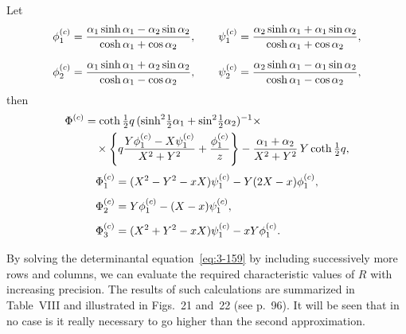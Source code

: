 Let
\begin{align}
\phi_1^{(c)} &= \frac{\alpha_1\sinh\alpha_1 - \alpha_2\sin\alpha_2}{\cosh\alpha_1 + \cos\alpha_2}, \qquad
\psi_1^{(c)} = \frac{\alpha_2\sinh\alpha_1 + \alpha_1\sin\alpha_2}{\cosh\alpha_1 + \cos\alpha_2}, \notag\\[6pt]
\phi_2^{(c)} &= \frac{\alpha_1\sinh\alpha_1 + \alpha_2\sin\alpha_2}{\cosh\alpha_1 - \cos\alpha_2}, \qquad
\psi_2^{(c)} = \frac{\alpha_2\sinh\alpha_1 - \alpha_1\sin\alpha_2}{\cosh\alpha_1 - \cos\alpha_2}, \label{eq:3-166}
\end{align}
then
\begin{align}
\Phi^{(c)} &= \coth\tfrac{1}{2}q\,(\sinh^2\!\tfrac{1}{2}\alpha_1 + \sin^2\!\tfrac{1}{2}\alpha_2)^{-1}\times \notag\\
&\quad\times\left\{q\frac{Y\phi_1^{(c)} - X\psi_1^{(c)}}{X^2+Y^2} + \frac{\phi_1^{(c)}}{z}\right\} - \frac{\alpha_1+\alpha_2}{X^2+Y^2}\,Y\coth\tfrac{1}{2}q, \label{eq:3-167}
\end{align}
\begin{align}
\Phi_1^{(c)} &= (X^2 - Y^2 - xX)\psi_1^{(c)} - Y(2X-x)\phi_1^{(c)}, \notag\\[4pt]
\Phi_2^{(c)} &= Y\phi_1^{(c)} - (X-x)\psi_1^{(c)}, \notag\\[4pt]
\Phi_3^{(c)} &= (X^2 + Y^2 - xX)\psi_1^{(c)} - xY\phi_1^{(c)}. \label{eq:3-168}
\end{align}

By solving the determinantal equation~\eqref{eq:3-159} by including successively more rows and columns, we can evaluate the required characteristic values of $R$ with increasing precision. The results of such calculations are summarized in Table~VIII and illustrated in Figs.~21 and~22 (see p.~96). It will be seen that in no case is it really necessary to go higher than the second approximation.

